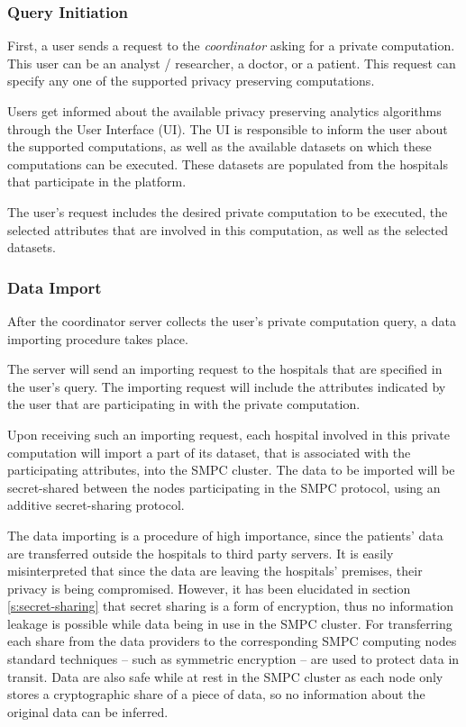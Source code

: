 \subsubsection{Query Initiation}\label{sss:query-initiation}
First, a user sends a request to the \textit{coordinator} asking for a private computation.
This user can be an analyst / researcher, a doctor, or a patient.
This request can specify any one of the supported privacy preserving computations.

Users get informed about the available privacy preserving analytics algorithms through the User Interface (UI).
The UI is responsible to inform the user about the supported computations, as well as the available datasets on which these computations can be executed.
These datasets are populated from the hospitals that participate in the platform.

The user's request includes the desired private computation to be executed, the selected attributes that are involved in this computation, as well as the selected datasets.

\subsubsection{Data Import}\label{sss:data-import}

After the coordinator server collects the user's private computation query, a data importing procedure takes place.

The server will send an importing request to the hospitals that are specified in the user's query.
The importing request will include the attributes indicated by the user that are participating in with the private computation.

Upon receiving such an importing request, each hospital involved in this private computation will import a part of its dataset, that is associated with the participating attributes, into the SMPC cluster.
The data to be imported will be secret\hyp shared between the nodes participating in the SMPC protocol, using an additive secret\hyp sharing protocol.

The data importing is a procedure of high importance, since the patients' data are transferred outside the hospitals to third party servers.
It is easily misinterpreted that since the data are leaving the hospitals' premises, their privacy is being compromised.
However, it has been elucidated in section \ref{s:secret-sharing} that secret sharing is a form of encryption, thus no information leakage is possible while data being in use in the SMPC cluster.
For transferring each share from the data providers to the corresponding SMPC computing nodes standard techniques -- such as symmetric encryption -- are used to protect data in transit.
Data are also safe while at rest in the SMPC cluster as each node only stores a cryptographic share of a piece of data, so no information about the original data can be inferred.


